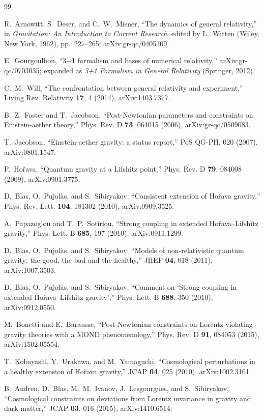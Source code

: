 \documentclass[11pt]{article}
\begin{document}
\begin{thebibliography}{99}

R.~Arnowitt, S.~Deser, and C.~W.~Misner,
``The dynamics of general relativity,'' in \emph{Gravitation: An Introduction to Current Research}, edited by L.~Witten (Wiley, New York, 1962), pp.~227--265; arXiv:gr-qc/0405109.

E.~Gourgoulhon,
``3+1 formalism and bases of numerical relativity,'' arXiv:gr-qc/0703035; expanded as \emph{3+1 Formalism in General Relativity} (Springer, 2012).

C.~M.~Will,
``The confrontation between general relativity and experiment,''
Living Rev. Relativity \textbf{17}, 4 (2014), arXiv:1403.7377.

B.~Z.~Foster and T.~Jacobson,
``Post-Newtonian parameters and constraints on Einstein-aether theory,''
Phys. Rev. D \textbf{73}, 064015 (2006), arXiv:gr-qc/0509083.

T.~Jacobson,
``Einstein-aether gravity: a status report,''
PoS QG-PH, 020 (2007), arXiv:0801.1547.

P.~Ho\v rava,
``Quantum gravity at a Lifshitz point,''
Phys. Rev. D \textbf{79}, 084008 (2009), arXiv:0901.3775.

D.~Blas, O.~Pujol\`as, and S.~Sibiryakov,
``Consistent extension of Ho\v rava gravity,''
Phys. Rev. Lett. \textbf{104}, 181302 (2010), arXiv:0909.3525.

A.~Papazoglou and T.~P.~Sotiriou,
``Strong coupling in extended Ho\v rava--Lifshitz gravity,''
Phys. Lett. B \textbf{685}, 197 (2010), arXiv:0911.1299.

D.~Blas, O.~Pujol\`as, and S.~Sibiryakov,
``Models of non-relativistic quantum gravity: the good, the bad and the healthy,''
JHEP \textbf{04}, 018 (2011), arXiv:1007.3503.

D.~Blas, O.~Pujol\`as, and S.~Sibiryakov,
``Comment on `Strong coupling in extended Ho\v rava--Lifshitz gravity',''
Phys. Lett. B \textbf{688}, 350 (2010), arXiv:0912.0550.

M.~Bonetti and E.~Barausse,
``Post-Newtonian constraints on Lorentz-violating gravity theories with a MOND phenomenology,''
Phys. Rev. D \textbf{91}, 084053 (2015), arXiv:1502.05554.


T.~Kobayashi, Y.~Urakawa, and M.~Yamaguchi,
``Cosmological perturbations in a healthy extension of Ho\v rava gravity,''
JCAP \textbf{04}, 025 (2010), arXiv:1002.3101.

B.~Audren, D.~Blas, M.~M.~Ivanov, J.~Lesgourgues, and S.~Sibiryakov,
``Cosmological constraints on deviations from Lorentz invariance in gravity and dark matter,''
JCAP \textbf{03}, 016 (2015), arXiv:1410.6514.

\end{thebibliography}
\end{document}
